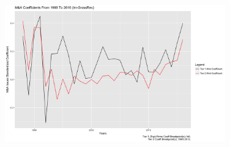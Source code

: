 \documentclass{article}
\begin{document}
\begin{figure}[H]\centering
\includegraphics[width=0.85\textwidth]{../IndivTexOutput/Breakpoints-21988-2016-lm-GrossRev-2.jpg}\end{figure}

\newpage
\end{document}
